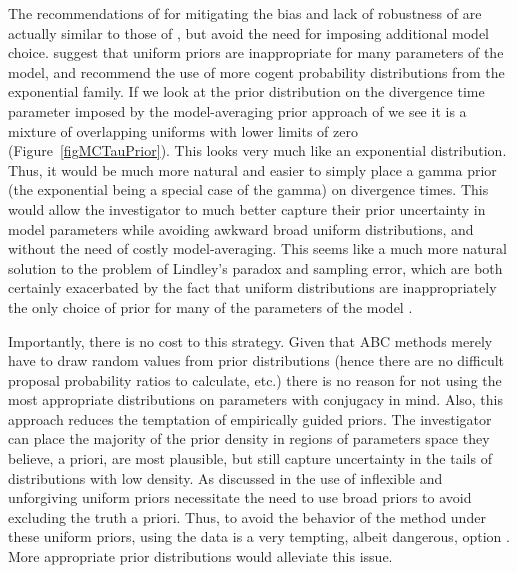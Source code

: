 \documentclass[letterpaper,12pt]{article}
\begin{document}
\begin{linenumbers}
The recommendations of \citet{Oaks2012} for mitigating the bias and lack of
robustness of \msb are actually similar to those of \citet{Hickerson2013}, but
avoid the need for imposing additional model choice.
\citet{Oaks2012} suggest that uniform priors are inappropriate for many
parameters of the \msb model, and recommend the use of more cogent probability
distributions from the exponential family.
If we look at the prior distribution on the divergence time parameter \divt{}
imposed by the model-averaging prior approach of \citet{Hickerson2013} we see
it is a mixture of overlapping uniforms with lower limits of zero
(Figure~\ref{figMCTauPrior}).
This looks very much like an exponential distribution.
Thus, it would be much more natural and easier to simply place a gamma prior
(the exponential being a special case of the gamma) on divergence times.
This would allow the investigator to much better capture their prior
uncertainty in model parameters while avoiding awkward broad uniform
distributions, and without the need of costly model-averaging.
This seems like a much more natural solution to the problem of Lindley's
paradox and sampling error, which are both certainly exacerbated by the fact
that uniform distributions are inappropriately the only choice of prior for
many of the parameters of the \msb model \citep[\divt{}, \ancestralTheta{},
, , \bottleTime{},
, , \locusRateHetShapeParameter,
\migrationRate{}, \recombinationRate;][]{Oaks2012}.

Importantly, there is no cost to this strategy.
Given that ABC methods merely have to draw random values from prior
distributions (hence there are no difficult proposal probability ratios to
calculate, etc.) there is no reason for not using the most appropriate
distributions on parameters with conjugacy in mind.
Also, this approach reduces the temptation of empirically guided priors.
The investigator can place the majority of the prior density in regions
of parameters space they believe, a priori, are most plausible, but still
capture uncertainty in the tails of distributions with low density.
As discussed in \citet{Oaks2012} the use of inflexible and unforgiving uniform
priors necessitate the need to use broad priors to avoid excluding the truth a
priori.
Thus, to avoid the behavior of the method under these uniform priors, using the
data is a very tempting, albeit dangerous, option \citep{Hickerson2013}.
More appropriate prior distributions would alleviate this issue.




\end{linenumbers}
\end{document}

